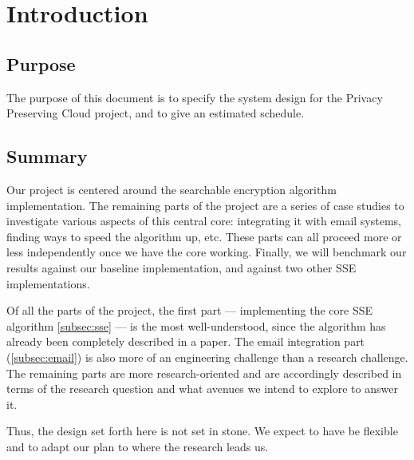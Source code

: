 \documentclass[onecolumn, draftclsnofoot,10pt, compsoc]{IEEEtran}
\begin{document}

\section{Introduction}

\subsection{ Purpose }

The purpose of this document is to specify the system design for the Privacy Preserving Cloud project, and to give an estimated schedule.


\subsection{ Summary }





Our project is centered around the searchable encryption algorithm implementation.
The remaining parts of the project are a series of case studies to investigate various aspects of this central core:
integrating it with email systems,
finding ways to speed the algorithm up, etc. 
These parts can all proceed more or less independently once we have the core working.
Finally, we will benchmark our results against our baseline implementation, and against two other SSE implementations.


Of all the parts of the project, the first part --- implementing the core SSE algorithm \ref{subsec:sse} --- is the most well-understood, since the algorithm has already been completely described in a paper.
The email integration part (\ref{subsec:email}) is also more of an engineering challenge than a research challenge. 
The remaining parts are more research-oriented and are accordingly described in terms of the research question and what avenues we intend to explore to answer it.

Thus, the design set forth here is not set in stone.
We expect to have be flexible and to adapt our plan to where the research leads us. 
\end{document}
